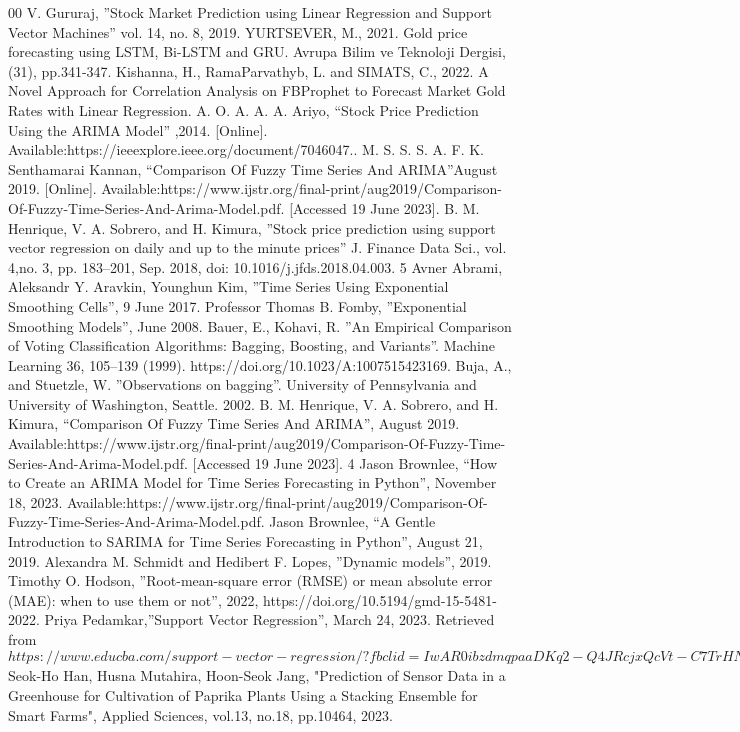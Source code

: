 \documentclass{ieeeojies}
\begin{document}
\begin{thebibliography}{00}
 V. Gururaj,  ''Stock Market Prediction using Linear Regression and Support Vector Machines'' vol. 14, no. 8, 2019.
 YURTSEVER, M., 2021. Gold price forecasting using LSTM, Bi-LSTM and GRU. Avrupa Bilim ve Teknoloji Dergisi, (31), pp.341-347.
 Kishanna, H., RamaParvathyb, L. and SIMATS, C., 2022. A Novel Approach for Correlation Analysis on FBProphet to Forecast Market Gold Rates with Linear Regression.
 A. O. A. A. A. Ariyo, ``Stock Price Prediction Using the ARIMA Model'' ,2014. [Online]. Available:https://ieeexplore.ieee.org/document/7046047..
 M. S. S. S. A. F. K. Senthamarai Kannan, ``Comparison Of Fuzzy Time Series And ARIMA''August 2019. [Online]. Available:https://www.ijstr.org/final-print/aug2019/Comparison-Of-Fuzzy-Time-Series-And-Arima-Model.pdf. [Accessed 19 June 2023].
 B. M. Henrique, V. A. Sobrero, and H. Kimura, ''Stock price prediction using support vector regression on daily and up to the minute prices'' J. Finance Data Sci., vol. 4,no. 3, pp. 183–201, Sep. 2018, doi: 10.1016/j.jfds.2018.04.003. 5
Avner Abrami, Aleksandr Y. Aravkin, Younghun Kim, ''Time Series Using Exponential Smoothing Cells'', 9 June 2017.
  Professor Thomas B. Fomby, ''Exponential Smoothing Models'', June 2008.
 Bauer, E., Kohavi, R. ''An Empirical Comparison of Voting Classification Algorithms: Bagging, Boosting, and Variants''. Machine Learning 36, 105–139 (1999). https://doi.org/10.1023/A:1007515423169.
 Buja, A., and Stuetzle, W. ''Observations on bagging''. University of Pennsylvania and University of Washington, Seattle. 2002.
 B. M. Henrique, V. A. Sobrero, and H. Kimura, ``Comparison Of Fuzzy Time Series And ARIMA'', August 2019. Available:https://www.ijstr.org/final-print/aug2019/Comparison-Of-Fuzzy-Time-Series-And-Arima-Model.pdf. [Accessed 19 June 2023]. 4
 Jason Brownlee, ``How to Create an ARIMA Model for Time Series Forecasting in Python'', November 18, 2023. Available:https://www.ijstr.org/final-print/aug2019/Comparison-Of-Fuzzy-Time-Series-And-Arima-Model.pdf. 
 Jason Brownlee, ``A Gentle Introduction to SARIMA for Time Series Forecasting in Python'', August 21, 2019. 
 Alexandra M. Schmidt and Hedibert F. Lopes, ''Dynamic models'', 2019. 
 Timothy O. Hodson, ''Root-mean-square error (RMSE) or mean absolute error (MAE): when to use them or not'', 2022, https://doi.org/10.5194/gmd-15-5481-2022.
 Priya Pedamkar,''Support Vector Regression'', March 24, 2023. Retrieved from \(https://www.educba.com/support-vector-regression/?fbclid=IwAR0ibzdmqpaaDKq2-Q4JRcjxQcVt-C7TrHNEc90q_tCSrn8rds9x2AG8Y78\)
 Seok-Ho Han, Husna Mutahira, Hoon-Seok Jang, "Prediction of Sensor Data in a Greenhouse for Cultivation of Paprika Plants Using a Stacking Ensemble for Smart Farms", Applied Sciences, vol.13, no.18, pp.10464, 2023.

\end{thebibliography}


\EOD
\end{document}
